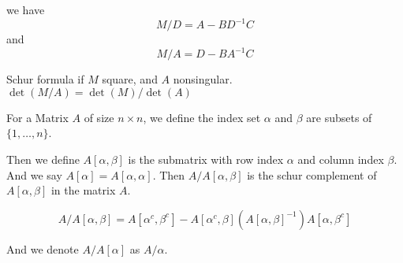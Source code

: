 we have 
$$M/D = A - BD^{-1}C$$
and
$$M/A = D - BA^{-1}C$$

\begin{lemma}
  Schur formula
  if $M$ square, and $A$ nonsingular.
  $\det(M/A) = \det(M)/ \det(A)$
\end{lemma}

For a Matrix $A$ of size $n \times n$,
we define the index set $\alpha$ and $\beta$ are subsets of $\{1,\dots,n\}$.

Then we define $A[\alpha,\beta]$ is the submatrix with row index $\alpha$ and column index $\beta$.
And we say $A[\alpha] = A[\alpha,\alpha]$.
Then $A/A[\alpha,\beta]$ is the schur complement of $A[\alpha,\beta]$ in the matrix $A$.

$$
A/A[\alpha,\beta] = A[\alpha^c,\beta^c] - A[\alpha^c,\beta](A[\alpha,\beta]^{-1})A[\alpha,\beta^c]
$$

And we denote $A/A[\alpha]$ as $A/\alpha$.
